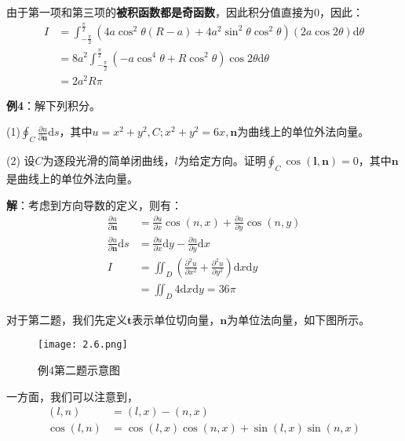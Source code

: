 \documentclass{ctexart}
\let\oldtextbf\textbf
\renewcommand{\textbf}[1]{\textcolor{brown!50!red}{\oldtextbf{#1}}}
\begin{document}
由于第一项和第三项的\textbf{\color{brown!50!red}被积函数都是奇函数}，因此积分值直接为0，因此：
\begin{align*}
I&=\int_{-\frac{\pi}{2}}^{\frac{\pi}{2} }(4a\cos^2\theta(R-a)+4a^2\sin^2\theta\cos^2\theta)(2a\cos 2\theta)
\mathrm{d}\theta\\
&=8a^2\int_{-\frac{\pi}{2}}^{\frac{\pi}{2} }(-a\cos^4\theta+R\cos^2\theta)\cos2\theta\mathrm{d}\theta\\
&=2a^2R\pi 
\end{align*}

\textbf{\color{brown!50!red}例4}：解下列积分。

(1)$\oint_C\frac{\partial u}{\partial \bm{n}}\mathrm{d}s$，其中$u=x^2+y^2,C;x^2+y^2=6x,\bm{n}$为曲线上的单位外法向量。

(2) 设$C$为逐段光滑的简单闭曲线，$l$为给定方向。证明$\oint_C \cos(\bm{l},\bm{n})=0$，其中$\bm{n}$是曲线上的单位外法向量。

\textbf{\color{brown!50!red}解}：考虑到方向导数的定义，则有：
\begin{align*}
\frac{\partial  u}{\partial  \bm{n}}&=\frac{\partial u}{\partial x}\cos(n,x)+\frac{\partial u}
{\partial y}\cos(n,y) \\
\frac{\partial  u}{\partial  \bm{n}}\mathrm{d}s &=\frac{\partial u}{\partial x}\mathrm{d}y -\frac{\partial u}
{\partial y}\mathrm{d}x \\
I&=\iint_D(\frac{\partial^2 u}{\partial x^2} +\frac{\partial^2 u}
{\partial y^2})\mathrm{d}x\mathrm{d}y\\&=\iint_D 4\mathrm{d}x\mathrm{d}y=36\pi 
\end{align*}

对于第二题，我们先定义$\bm{t}$表示单位切向量，$\bm{n}$为单位法向量，如下图所示。
\begin{figure}[H]    
\centering     
\renewcommand{\figurename}{图}     
\renewcommand{\thefigure}{2.6}    
\begin{myimagebox}[width=0.5\textwidth] %
\texttt{[image: 2.6.png]} %
\end{myimagebox}     
\caption{\label{fig:2.6}例4第二题示意图}   
\end{figure}

一方面，我们可以注意到，
\begin{align*}
(l,n)&=(l,x)-(n,x)\\
\cos(l,n)&=\cos(l,x)\cos(n,x)+\sin(l,x)\sin(n,x)
\end{align*}
\end{document}
